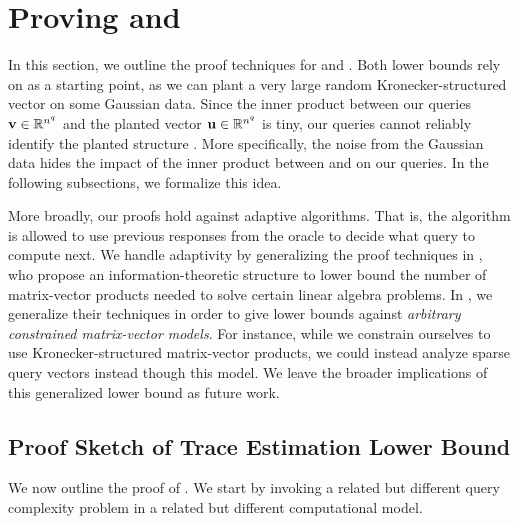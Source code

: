 
\section{Proving  and }
\label{sec:conditioned}

In this section, we outline the proof techniques for  and .
Both lower bounds rely on  as a starting point, as we can plant a very large random Kronecker-structured vector on some Gaussian data.
Since the inner product between our queries \(\boldsymbol{\mathrm{v}}\in{\mathbb R}^{n^q}\) and the planted vector \(\boldsymbol{\mathrm{u}}\in{\mathbb R}^{n^q}\) is tiny, our queries cannot reliably identify the planted structure \vu.
More specifically, the noise from the Gaussian data hides the impact of the inner product between \vv and \vu on our queries.
In the following subsections, we formalize this idea.

More broadly, our proofs hold against adaptive algorithms.
That is, the algorithm is allowed to use previous responses from the oracle to decide what query to compute next.
We handle adaptivity by generalizing the proof techniques in \cite{simchowitz2017gap}, who propose an information-theoretic structure to lower bound the number of matrix-vector products needed to solve certain linear algebra problems.
In , we generalize their techniques in order to give lower bounds against \emph{arbitrary constrained matrix-vector models}.
For instance, while we constrain ourselves to use Kronecker-structured matrix-vector products, we could instead analyze sparse query vectors instead though this model.
We leave the broader implications of this generalized lower bound as future work.

\subsection{Proof Sketch of Trace Estimation Lower Bound}
\label{sec:trace-est-proof-sketch}

We now outline the proof of .
We start by invoking a related but different query complexity problem in a related but different computational model.

